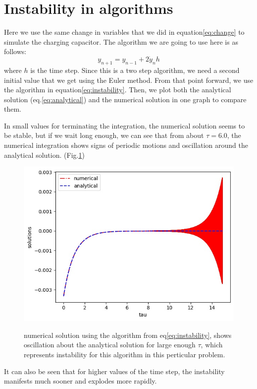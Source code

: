 \documentclass[12pt, a4paper]{article}
\begin{document}
	\section{Instability in algorithms}
	Here we use the same change in variables that we did in equation\ref{eq:change} to simulate the charging capacitor.
	The algorithm we are going to use here is as follows:
	\begin{equation} \label{eq:instability}
		y_{n + 1} = y_{n - 1} + 2 \dot{y}_n h
	\end{equation}
	where $h$ is the time step. Since this is a two step algorithm, we need a second initial value that we get using the Euler method. From that point
	forward, we use the algorithm in equation\ref{eq:instability}. Then, we plot both the analytical solution (eq.\ref{eq:analytical}) and the 
	numerical solution in one graph to compare them.
	
	In small values for terminating the integration, the numerical solution seems to be stable, but if we wait long enough, we can see that
	from about $\tau = 6.0$, the numerical integration shows signs of periodic motions and oscillation around the analytical solution. 
	(Fig.\ref{fig:instability})
	\begin{figure}[h!]
		\centering
		\includegraphics[width=0.8\linewidth]{../p3/instability.jpg}
		\label{fig:instability}
		\caption{numerical solution using the algorithm from eq\ref{eq:instability}, shows oscillation about the analytical solution for 
			large enough $\tau$, which represents instability for this algorithm in this perticular problem.}
	\end{figure}

	It can also be seen that for higher values of the time step, the instability manifests much sooner and explodes more rapidly.
\end{document}
